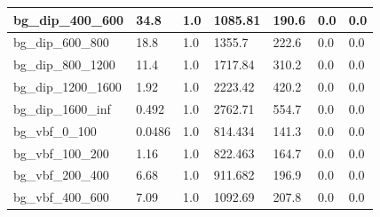 \documentclass[a4paper, 10pt]{article}
\begin{document}
\begin{table}[H]
\begin{center}
\begin{tabular}{|m{23.0mm}|m{23.0mm}|m{18.0mm}|m{19.0mm}|m{19.0mm}|m{19.0mm}|m{19.0mm}|}
      \hline
      {\cellcolor{white}         bg\_dip\_400\_600}& {\cellcolor{white}         34.8}& {\cellcolor{white}         1.0}& {\cellcolor{white}         1085.81}& {\cellcolor{white}         190.6}& {\cellcolor{green}         0.0}& {\cellcolor{green}         0.0}\\
      \hline
      {\cellcolor{white}         bg\_dip\_600\_800}& {\cellcolor{white}         18.8}& {\cellcolor{white}         1.0}& {\cellcolor{white}         1355.7}& {\cellcolor{white}         222.6}& {\cellcolor{green}         0.0}& {\cellcolor{green}         0.0}\\
      \hline
      {\cellcolor{white}         bg\_dip\_800\_1200}& {\cellcolor{white}         11.4}& {\cellcolor{white}         1.0}& {\cellcolor{white}         1717.84}& {\cellcolor{white}         310.2}& {\cellcolor{green}         0.0}& {\cellcolor{green}         0.0}\\
      \hline
      {\cellcolor{white}         bg\_dip\_1200\_1600}& {\cellcolor{white}         1.92}& {\cellcolor{white}         1.0}& {\cellcolor{white}         2223.42}& {\cellcolor{white}         420.2}& {\cellcolor{green}         0.0}& {\cellcolor{green}         0.0}\\
      \hline
      {\cellcolor{white}         bg\_dip\_1600\_inf}& {\cellcolor{white}         0.492}& {\cellcolor{white}         1.0}& {\cellcolor{white}         2762.71}& {\cellcolor{white}         554.7}& {\cellcolor{green}         0.0}& {\cellcolor{green}         0.0}\\
      \hline
      {\cellcolor{white}         bg\_vbf\_0\_100}& {\cellcolor{white}         0.0486}& {\cellcolor{white}         1.0}& {\cellcolor{white}         814.434}& {\cellcolor{white}         141.3}& {\cellcolor{green}         0.0}& {\cellcolor{green}         0.0}\\
      \hline
      {\cellcolor{white}         bg\_vbf\_100\_200}& {\cellcolor{white}         1.16}& {\cellcolor{white}         1.0}& {\cellcolor{white}         822.463}& {\cellcolor{white}         164.7}& {\cellcolor{green}         0.0}& {\cellcolor{green}         0.0}\\
      \hline
      {\cellcolor{white}         bg\_vbf\_200\_400}& {\cellcolor{white}         6.68}& {\cellcolor{white}         1.0}& {\cellcolor{white}         911.682}& {\cellcolor{white}         196.9}& {\cellcolor{green}         0.0}& {\cellcolor{green}         0.0}\\
      \hline
      {\cellcolor{white}         bg\_vbf\_400\_600}& {\cellcolor{white}         7.09}& {\cellcolor{white}         1.0}& {\cellcolor{white}         1092.69}& {\cellcolor{white}         207.8}& {\cellcolor{green}         0.0}& {\cellcolor{green}         0.0}\\

\end{tabular}
\end{center}
\end{table}
\end{document}
